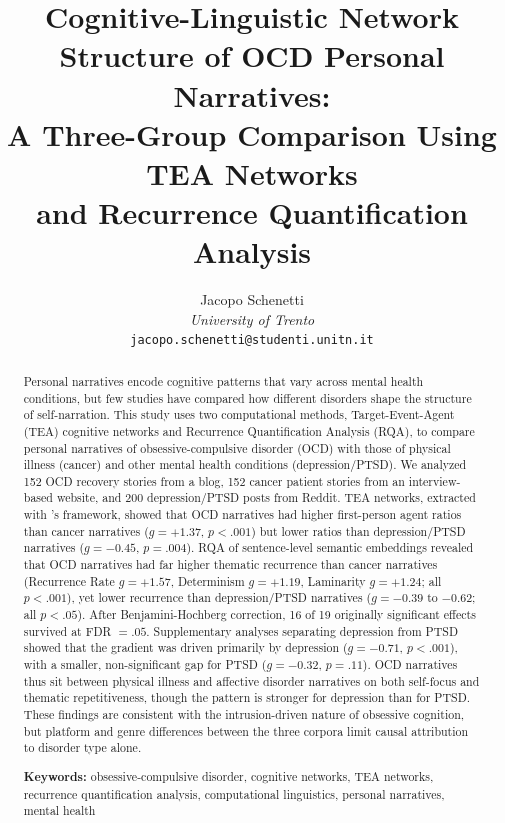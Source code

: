 \documentclass[11pt,a4paper]{article}
\title{Cognitive-Linguistic Network Structure of OCD Personal Narratives:\\
A Three-Group Comparison Using TEA Networks\\and Recurrence Quantification Analysis}
\author{
Jacopo Schenetti\\
\textit{University of Trento}\\
\texttt{jacopo.schenetti@studenti.unitn.it}
}
\date{}
\begin{document}
\maketitle

\begin{abstract}
Personal narratives encode cognitive patterns that vary across mental health conditions, but few studies have compared how different disorders shape the structure of self-narration. This study uses two computational methods, Target-Event-Agent (TEA) cognitive networks and Recurrence Quantification Analysis (RQA), to compare personal narratives of obsessive-compulsive disorder (OCD) with those of physical illness (cancer) and other mental health conditions (depression/PTSD). We analyzed 152 OCD recovery stories from a blog, 152 cancer patient stories from an interview-based website, and 200 depression/PTSD posts from Reddit. TEA networks, extracted with \citet{franchini2026tea}'s framework, showed that OCD narratives had higher first-person agent ratios than cancer narratives ($g = +1.37$, $p < .001$) but lower ratios than depression/PTSD narratives ($g = -0.45$, $p = .004$). RQA of sentence-level semantic embeddings revealed that OCD narratives had far higher thematic recurrence than cancer narratives (Recurrence Rate $g = +1.57$, Determinism $g = +1.19$, Laminarity $g = +1.24$; all $p < .001$), yet lower recurrence than depression/PTSD narratives ($g = -0.39$ to $-0.62$; all $p < .05$). After Benjamini-Hochberg correction, 16 of 19 originally significant effects survived at FDR $= .05$. Supplementary analyses separating depression from PTSD showed that the gradient was driven primarily by depression ($g = -0.71$, $p < .001$), with a smaller, non-significant gap for PTSD ($g = -0.32$, $p = .11$). OCD narratives thus sit between physical illness and affective disorder narratives on both self-focus and thematic repetitiveness, though the pattern is stronger for depression than for PTSD. These findings are consistent with the intrusion-driven nature of obsessive cognition, but platform and genre differences between the three corpora limit causal attribution to disorder type alone.

\medskip\noindent\textbf{Keywords:} obsessive-compulsive disorder, cognitive networks, TEA networks, recurrence quantification analysis, computational linguistics, personal narratives, mental health
\end{abstract}

\end{document}
